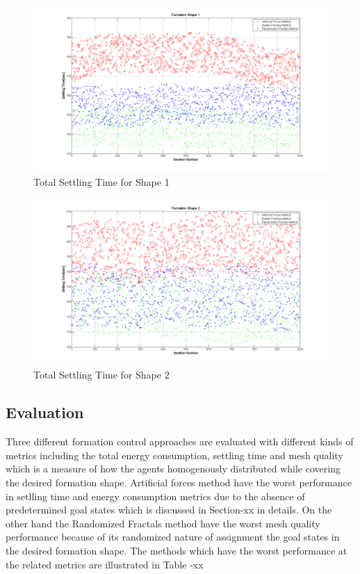 \begin{figure}[H]
\caption{Total Settling Time for Shape 1}
\centerline{\includegraphics[scale = 0.35]{Total_Time_Shape_1}}
\end{figure} 
		
\begin{figure}[H]
\caption{Total Settling Time for Shape 2}
\centerline{\includegraphics[scale = 0.35]{Total_Time_Shape_2}}
\end{figure} 
		 
\subsection{Evaluation} 
Three different formation control approaches are evaluated with different kinds of metrics including the total energy consumption, settling time and mesh quality which is a measure of how the agents homogenously distributed while covering the desired formation shape. Artificial forces method have the worst performance in setlling time and energy consumption metrics due to the absence of predetermined goal states which is discussed in Section-xx in details. On the other hand the Randomized Fractals method have the worst mesh quality performance because of its randomized nature of assignment the goal states in the desired formation shape. The methods which have the worst performance at the related metrics are illustrated in Table -xx
		
